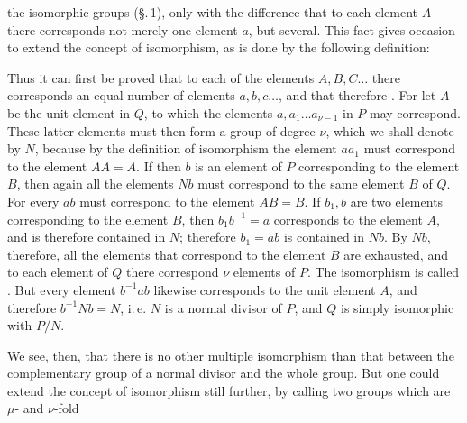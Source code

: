 

the isomorphic groups (\S.\,1), only with the difference that to each element $A$ there corresponds not merely one element $a$, but several. This fact gives occasion to extend the concept of isomorphism, as is done by the following definition:


Thus it can first be proved that to each of the elements $A, B, C \dots$ there corresponds an equal number of elements $a, b, c \dots$, and that therefore . For let $A$ be the unit element in $Q$, to which the elements $a, a_1 \dots a_{\nu-1}$ in $P$ may correspond. These latter elements must then form a group of degree $\nu$, which we shall denote by $N$, because by the definition of isomorphism the element $a a_1$ must correspond to the element $AA = A$. If then $b$ is an element of $P$ corresponding to the element $B$, then again all the elements $Nb$ must correspond to the same element $B$ of $Q$. For every $ab$ must correspond to the element $AB = B$. If $b_1, b$ are two elements corresponding to the element $B$, then $b_1 b^{-1} = a$ corresponds to the element $A$, and is therefore contained in $N$; therefore $b_1 = ab$ is contained in $Nb$. By $Nb$, therefore, all the elements that correspond to the element $B$ are exhausted, and to each element of $Q$ there correspond $\nu$ elements of $P$. The isomorphism is called . But every element $b^{-1}ab$ likewise corresponds to the unit element $A$, and therefore $b^{-1}Nb = N$, i.\,e. $N$ is a normal divisor of $P$, and $Q$ is simply isomorphic with $P/N$.

We see, then, that there is no other multiple isomorphism than that between the complementary group of a normal divisor and the whole group. But one could extend the concept of isomorphism still further, by calling two groups which are $\mu$- and $\nu$-fold
